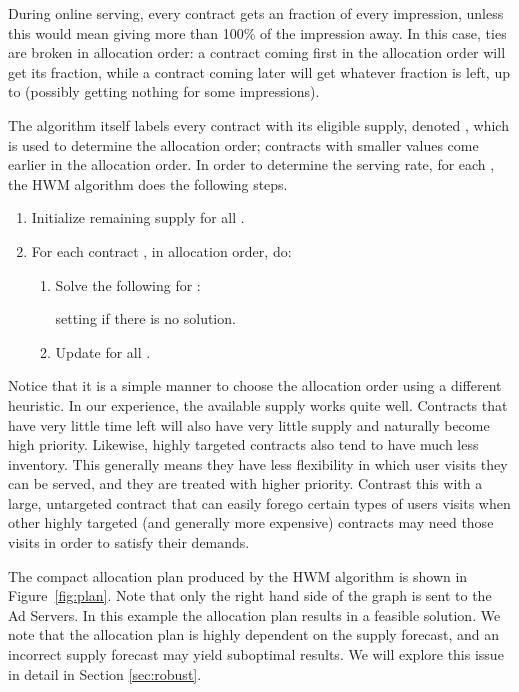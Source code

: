 During online serving, every contract gets an  fraction of
every impression, unless this would mean giving more than 100\% of
the impression away.  In this case, ties are broken in allocation
order: a contract  coming first in the allocation order will get
its  fraction, while a contract  coming later will get
whatever fraction is left, up to   (possibly getting
nothing for some impressions).

The algorithm itself labels every contract  with its eligible supply, denoted , which is used to
determine the allocation order; contracts with smaller  values come earlier in the allocation order.
In order to determine the serving rate,  for each , the HWM algorithm does the following steps.
\begin{enumerate}\itemsep=0in
\item Initialize remaining supply  for all .
\item For each contract , in allocation order, do:
    \begin{enumerate}\itemsep=0in
    \item Solve the following for :
        
        setting  if there is no solution.
    \item Update  for all .
    \end{enumerate}
\end{enumerate}
Notice that it is a simple manner to choose the allocation order using a different heuristic.  In our experience, the available
supply works quite well.  Contracts that have very little time left will also have very little supply and naturally become high
priority.  Likewise, highly targeted contracts also tend to have much less inventory.  This generally means they have less flexibility
in which user visits they can be served, and they are treated with higher priority.
Contrast this with a large, untargeted contract that can easily forego certain types of users visits when other highly targeted (and generally
more expensive) contracts may need those visits in order to satisfy their demands.

The compact allocation plan produced by the HWM algorithm is shown in Figure~\ref{fig:plan}.
Note that only the right hand side of the graph is sent to the Ad Servers.
In this example the allocation plan results in a feasible solution.
We note that the allocation plan is highly dependent on the supply forecast,
and an incorrect supply forecast may yield suboptimal results. We will explore this issue in detail in Section \ref{sec:robust}.

